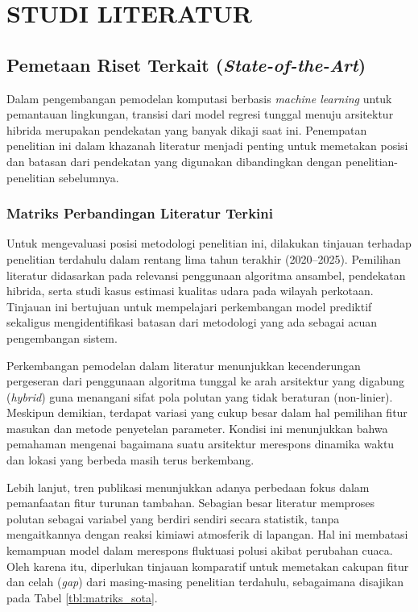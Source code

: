 \cleardoublepage
\chapter{STUDI LITERATUR}
\label{chap:studi-literatur}

\section{Pemetaan Riset Terkait (\textit{State-of-the-Art})}

Dalam pengembangan pemodelan komputasi berbasis \textit{machine learning} untuk pemantauan lingkungan, transisi dari model regresi tunggal menuju arsitektur hibrida merupakan pendekatan yang banyak dikaji saat ini. Penempatan penelitian ini dalam khazanah literatur menjadi penting untuk memetakan posisi dan batasan dari pendekatan yang digunakan dibandingkan dengan penelitian-penelitian sebelumnya.

\subsection{Matriks Perbandingan Literatur Terkini}

Untuk mengevaluasi posisi metodologi penelitian ini, dilakukan tinjauan terhadap penelitian terdahulu dalam rentang lima tahun terakhir (2020--2025). Pemilihan literatur didasarkan pada relevansi penggunaan algoritma ansambel, pendekatan hibrida, serta studi kasus estimasi kualitas udara pada wilayah perkotaan. Tinjauan ini bertujuan untuk mempelajari perkembangan model prediktif sekaligus mengidentifikasi batasan dari metodologi yang ada sebagai acuan pengembangan sistem.

Perkembangan pemodelan dalam literatur menunjukkan kecenderungan pergeseran dari penggunaan algoritma tunggal ke arah arsitektur yang digabung (\textit{hybrid}) guna menangani sifat pola polutan yang tidak beraturan (non-linier). Meskipun demikian, terdapat variasi yang cukup besar dalam hal pemilihan fitur masukan dan metode penyetelan parameter. Kondisi ini menunjukkan bahwa pemahaman mengenai bagaimana suatu arsitektur merespons dinamika waktu dan lokasi yang berbeda masih terus berkembang.

Lebih lanjut, tren publikasi menunjukkan adanya perbedaan fokus dalam pemanfaatan fitur turunan tambahan. Sebagian besar literatur memproses polutan sebagai variabel yang berdiri sendiri secara statistik, tanpa mengaitkannya dengan reaksi kimiawi atmosferik di lapangan. Hal ini membatasi kemampuan model dalam merespons fluktuasi polusi akibat perubahan cuaca. Oleh karena itu, diperlukan tinjauan komparatif untuk memetakan cakupan fitur dan celah (\textit{gap}) dari masing-masing penelitian terdahulu, sebagaimana disajikan pada Tabel \ref{tbl:matriks_sota}.

